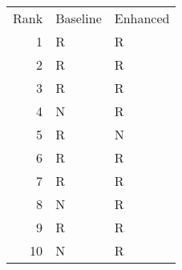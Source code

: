 \begin{tabular}{rll}
Rank & Baseline & Enhanced \\
1 & R & R \\
2 & R & R \\
3 & R & R \\
4 & N & R \\
5 & R & N \\
6 & R & R \\
7 & R & R \\
8 & N & R \\
9 & R & R \\
10 & N & R \\
\end{tabular}
